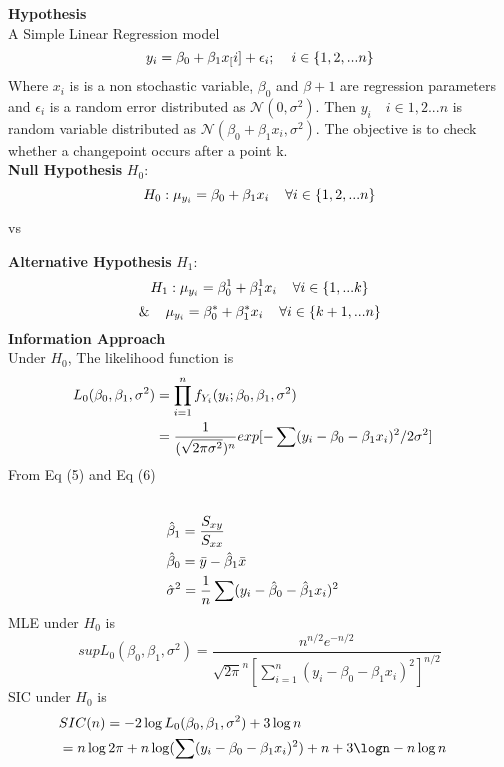 \documentclass{article}
\newcommand\tab[1][0.4cm]{\hspace*{#1}}
\begin{document}
\textbf{Hypothesis}\\
A Simple Linear Regression model\\
$$y_{i} = \beta_{0} + \beta_{1}x_[i] + \epsilon_{i}; \tab i\in \{1,2,...n\}$$
Where $x_{i}$ is is a non stochastic variable, $\beta_{0}$ and $\beta+{1}$ are regression parameters and $\epsilon_{i}$ is a random error distributed as $\mathcal{N}(0,\sigma^{2})$. Then $y_{i}\quad i \in {1,2...n}$ is random variable distributed as $\mathcal{N}(\beta_{0} + \beta_{1}x_{i},\sigma^{2})$. The objective is to check whether a changepoint occurs after a point k.\\
\textbf{Null Hypothesis} $H_{0}$:
$$ H_{0} : \mu_{y_{i}} = \beta_{0}+\beta_{1}x_{i} \tab \forall i \in \{1,2,...n\}$$
\begin{center}
    vs
\end{center}
\textbf{Alternative Hypothesis} $H_{1}$:\\
 $$H_{1} : \mu_{y_{i}} = \beta_{0}^{1}+\beta_{1}^{1}x_{i} \tab \forall i \in \{1,...k\} $$
$$ \& \tab  \mu_{y_{i}} = \beta_{0}^{*}+\beta_{1}^{*}x_{i} \tab \forall i \in \{k+1,...n\}$$
\textbf{Information Approach}\\
Under $H_{0}$, The likelihood function is \\
\begin{equation}
\begin{split}
    L_{0}(\beta_{0}, \beta_{1},\sigma^{2}) &= \prod_{i=1}^{n}f_{Y_{i}}(y_{i};\beta_{0},\beta_{1},\sigma^{2})
                     \cr                 & =  \frac{1}{(\sqrt{2\pi\sigma^{2}})^{n}} exp[-\sum(y_{i} - \beta_{0}-\beta_{1}x_{i})^{2}/2\sigma^{2}]
\end{split}
\end{equation}
From Eq (5) and Eq (6) 
\begin{equation*}
    \begin{split}
\cr    &\hat{\beta}_{1} = \frac{S_{xy}}{S_{xx}}
\cr    & \hat{\beta}_{0} = \Bar{y} - \hat{\beta}_{1}\Bar{x}
\cr    & \hat{\sigma}^{2} = \frac{1}{n} \sum (y_{i} - \hat{\beta}_{0} - \hat{\beta}_{1}x_{i})^{2}
    \end{split}
\end{equation*}
MLE under $H_{0}$ is \\
\begin{equation*}
    sup L_{0}(\beta_{0},\beta_{1},\sigma^{2}) = \frac{n^{n/2}e^{-n/2}}{\sqrt{2\pi}^{n}[\sum_{i=1}^{n}(y_{i} -\beta_{0} -\beta_{1}x_{i} )^{2}]^{n/2}}
\end{equation*}
SIC under $H_{0}$ is
\begin{equation*}
    \begin{split}
       & SIC(n) = -2\log L_{0}(\beta_{0},\beta_{1},\sigma^{2}) + 3\log n
\cr     &       = n\log 2\pi + n\log(\sum(y_{i} -\beta_{0} -\beta_{1}x_{i})^{2} ) + n + 3\logn - n\log n
    \end{split}
\end{equation*}
\end{document}
